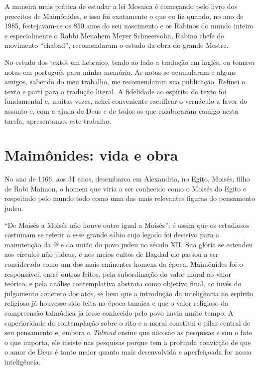 A maneira mais prática de estudar a lei Mosaica é começando pelo livro
dos preceitos de Maimônides, e isso foi exatamente o que eu fiz quando,
no ano de 1985, festejavam-se os 850 anos do seu nascimento e os Rabinos
do mundo inteiro e especialmente o Rabbi Menahem Meyer Schneersohn,
Rabino chefe do movimento ``chabad'', recomendaram o estudo da obra do
grande Mestre.

No estudo dos textos em hebraico, tendo ao lado a tradução em inglês, eu
tomava notas em português para minha memória. As notas se acumularam e
alguns amigos, sabendo do meu trabalho, me recomendaram sua publicação.
Refinei o texto e parti para a tradução literal. A fidelidade ao
espírito do texto foi fundamental e, muitas vezes, achei conveniente
sacrificar o vernáculo a favor do assunto e, com a ajuda de Deus e de
todos os que colaboraram comigo nesta tarefa, apresentamos este
trabalho.

\section{Maimônides: vida e obra}

No ano de 1166, aos 31 anos, desembarca em Alexandria, no Egito, Moisés,
filho de Rabi Maimon, o homem que viria a ser conhecido como o Moisés
do Egito e respeitado pelo mundo todo como uma das mais relevantes
figuras do pensamento judeu.

``De Moisés a Moisés não houve outro igual a Moisés'': é assim que os
estudiosos costumam se referir a esse grande sábio cujo legado foi
decisivo para a manutenção da fé e da união do povo judeu no século XII.
Sua glória se estendeu aos círculos não judeus, e nos meios cultos de
Bagdad ele passou a ser considerado como um dos mais eminentes homens da
época. Maimônides foi o responsável, entre outros feitos, pela
subordinação do valor moral ao valor teórico, e pela análise
contemplativa abstrata como objetivo final, ao invés do julgamento
concreto dos atos, se bem que a introdução da inteligência no espírito
religioso já houvesse sido feita na época tanaica e que o valor
religioso da compreensão talmúdica já fosse conhecido pelo povo havia
muito tempo. A superioridade da contemplação sobre o rito e a moral
constitui o pilar central de seu pensamento e, embora o \emph{Talmud}
ensine que não são as pesquisas e sim o fato o que importa, ele insiste
nas pesquisas porque tem a profunda convicção de que o amor de Deus é
tanto maior quanto mais desenvolvida e aperfeiçoada for nossa
inteligência.

